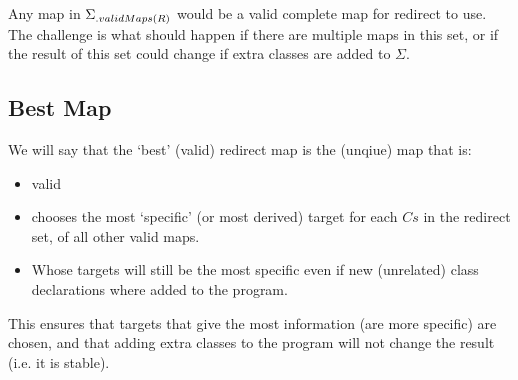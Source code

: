 \begin{defs}
\end{defs}

Any map in $\Sigma{\ensuremath{{}_{.{validMaps}({R})}}}$ would be a valid complete map for redirect to use. The challenge is what should happen if there are multiple maps in this set, or if the result of this set could change if extra classes are added to $\Sigma$.

\subsection {Best Map}
We will say that the `best' (valid) redirect map is the (unqiue) map that is:
\begin{itemize}
	\item valid
	\item chooses the most `specific' (or most derived) target for each $Cs$ in the redirect set, of all other valid maps.
	\item Whose targets will still be the most specific even if new (unrelated) class declarations where added to the program. 
\end{itemize}

This ensures that targets that give the most information (are more specific) are chosen, and that adding extra classes to the program will not change the result (i.e. it is stable).


